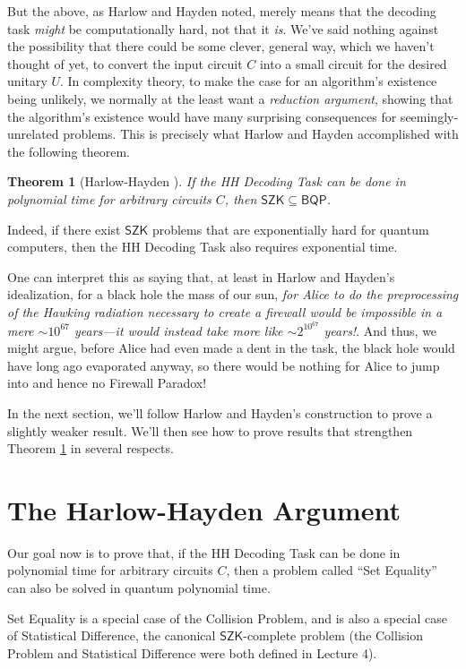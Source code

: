 \documentclass[12pt]{report}
\theoremstyle{plain}
\newtheorem{theorem}{Theorem}[section]
\theoremstyle{definition}
\begin{document}
But the above, as Harlow and Hayden noted, merely means that the decoding task {\em might} be computationally hard, not that it {\em is}.  We've said nothing against the possibility that there could be some clever, general way, which we haven't thought of yet, to convert the input circuit $C$ into a small circuit for the desired unitary $U$.  In complexity theory, to make the case for an algorithm's existence being unlikely, we normally at the least want a {\em reduction argument}, showing that the algorithm's existence would have many surprising consequences for seemingly-unrelated problems.  This is precisely what Harlow and Hayden accomplished with the following theorem.

\begin{theorem}[Harlow-Hayden \cite{harlowhayden}]
\label{hhthm}
If the HH Decoding Task can be done in polynomial time for arbitrary circuits $C$,
then $\mathsf{SZK} \subseteq \mathsf{BQP}$.
\end{theorem}

Indeed, if there exist $\mathsf{SZK}$ problems that are exponentially hard for quantum computers, then the HH Decoding Task also requires exponential time.

One can interpret this as saying that, at least in Harlow and Hayden's idealization, for a black hole the mass of our sun, {\em for Alice to do the preprocessing of the Hawking radiation necessary to create a firewall would be impossible in a mere $\sim 10^{67}$ years---it would instead take more like $\sim 2^{10^{67}}$ years!}.  And thus, we might argue, before Alice had even made a dent in the task, the black hole would have long ago evaporated anyway, so there would be nothing for Alice to jump into and hence no Firewall Paradox!

In the next section, we'll follow Harlow and Hayden's construction to prove a slightly weaker result.  We'll then see how to prove results that strengthen Theorem \ref{hhthm} in several respects.

\section{The Harlow-Hayden Argument}

Our goal now is to prove that, if the HH Decoding Task can be done in polynomial time for arbitrary circuits $C$, then a problem called ``Set Equality'' can also be solved in quantum polynomial time.

Set Equality is a special case of the Collision Problem, and is also a special case of Statistical Difference,
the canonical $\mathsf{SZK}$-complete problem (the Collision Problem and Statistical Difference were both defined in Lecture 4).
\end{document}
